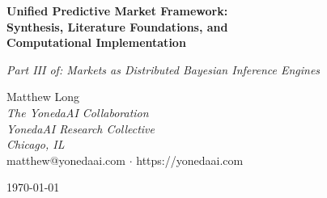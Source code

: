 \documentclass[12pt,a4paper]{article}
\theoremstyle{definition}
\begin{document}

\begin{center}
{\LARGE\bfseries Unified Predictive Market Framework:\\[6pt]
Synthesis, Literature Foundations, and\\[4pt]
Computational Implementation}

\vspace{0.5cm}

{\large\itshape Part III of: Markets as Distributed Bayesian Inference Engines}

\vspace{1.0cm}

{\large Matthew Long}\\[4pt]
{\itshape The YonedaAI Collaboration}\\
{\itshape YonedaAI Research Collective}\\
{\itshape Chicago, IL}\\[4pt]
{\ttfamily matthew@yonedaai.com} $\cdot$ {\ttfamily https://yonedaai.com}

\vspace{0.8cm}

\today

\vspace{0.6cm}

\end{center}
\end{document}
